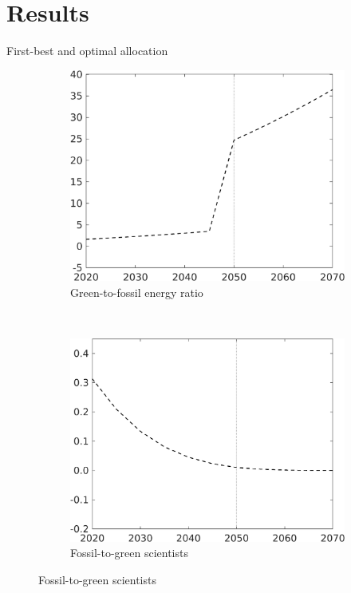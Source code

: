 \documentclass[11pt,aspectratio=169]{beamer}
\begin{document}
	\section{Results}
\begin{frame}{First-best and optimal allocation}
	\pause
	\begin{figure}[h!!]
		\centering
		\begin{subfigure}{0.45\textwidth}		
			\caption{{Green-to-fossil energy ratio}}
			\includegraphics[width=1\textwidth]{../codding_model/own_basedOnFried/optimalPol_010922_revision/figures/all_13Sept22/NewCalib_eff_noBau_T_GFF_Sun2_emnet1_spillover0_knspil3_xgr0_nsk0_sep0_extern0_PV1_etaa0.79_lgd0.png}
		\end{subfigure}
		\begin{minipage}[]{0.05\textwidth}
			\
		\end{minipage}
		\begin{subfigure}{0.45\textwidth}		
			\caption{{Fossil-to-green scientists}}
			\includegraphics[width=1\textwidth]{../codding_model/own_basedOnFried/optimalPol_010922_revision/figures/all_13Sept22/NewCalib_eff_noBau_T_sffsg_Sun2_emnet1_spillover0_knspil3_xgr0_nsk0_sep0_extern0_PV1_etaa0.79_lgd0.png}

\end{subfigure}
\end{figure}
\end{frame}
\end{document}
